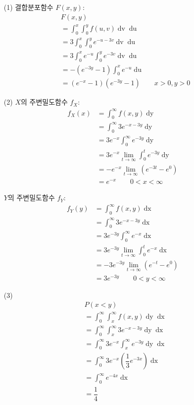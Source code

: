 \begin{itemize}
  \item [(1)] 결합분포함수 $F\left(x, y\right)$:
\begin{align*}
	& F\left(x, y\right) \\
	&= \int_0^x \int_0^y f\left(u, v\right) \mathop{dv} \mathop{du} \\
	&= 3 \int_0^x \int_0^y e^{-u-3v} \mathop{dv} \mathop{du} \\
	&= 3 \int_0^x e^{-u} \int_0^y e^{-3v} \mathop{dv} \mathop{du} \\
	&= -\left(e^{-3y} - 1\right) \int_0^x e^{-u} \mathop{du} \\
	&= \left(e^{-x} - 1\right)\left(e^{-3y} - 1\right) \qquad x>0, y>0
\end{align*}

  \item [(2)] $X$의 주변밀도함수 $f_X$:
\begin{align*}
	f_X\left(x\right) &= \int_0^\infty f\left(x, y\right) \mathop{dy} \\
	&= \int_0^\infty 3e^{-x-3y} \mathop{dy} \\
	&= 3e^{-x} \int_0^\infty e^{-3y} \mathop{dy} \\
	&= 3e^{-x} \lim_{t\rightarrow\infty} \int_0^t e^{-3y} \mathop{dy} \\
	&= -e^{-x} \lim_{t\rightarrow\infty} \left(e^{-3t} - e^0\right) \\
	&= e^{-x}  \qquad 0<x<\infty
\end{align*}

$Y$의 주변밀도함수 $f_Y$:
\begin{align*}
	f_Y\left(y\right) &= \int_0^\infty f\left(x, y\right) \mathop{dx} \\
	&= \int_0^\infty 3e^{-x-3y} \mathop{dx} \\
	&= 3e^{-3y} \int_0^\infty e^{-x} \mathop{dx} \\
	&= 3e^{-3y} \lim_{t\rightarrow\infty} \int_0^t e^{-x} \mathop{dx} \\
	&= -3e^{-3y} \lim_{t\rightarrow\infty} \left(e^{-t} - e^0\right) \\
	&= 3e^{-3y}  \qquad 0<y<\infty
\end{align*}

  \item [(3)]
\begin{align*}
	& P\left(x<y\right) \\
	&= \int_0^\infty \int_x^\infty f\left(x, y\right) \mathop{dy} \mathop{dx} \\
	&= \int_0^\infty \int_x^\infty 3e^{-x-3y} \mathop{dy} \mathop{dx} \\
	&= \int_0^\infty 3e^{-x} \int_x^\infty e^{-3y} \mathop{dy} \mathop{dx} \\
	&= \int_0^\infty 3e^{-x} \left(\dfrac{1}{3} e^{-3x}\right) \mathop{dx} \\
	&= \int_0^\infty e^{-4x} \mathop{dx} \\
	&= \dfrac{1}{4}
\end{align*}
\end{itemize}
 
